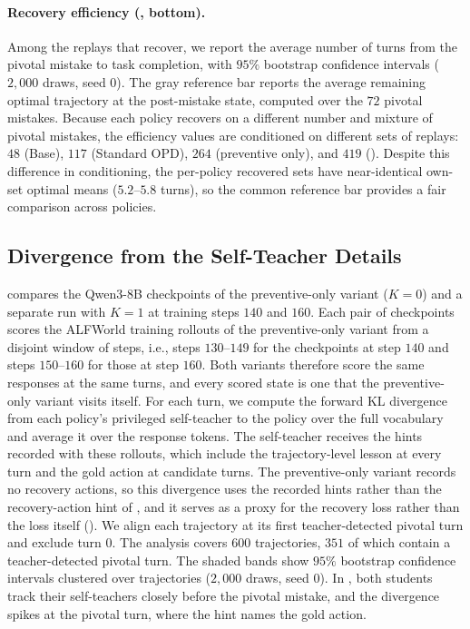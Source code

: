 \paragraph{Recovery efficiency (, bottom).} Among the replays that recover, we report the average number of turns from the pivotal mistake to task completion, with $95\%$ bootstrap confidence intervals ($2{,}000$ draws, seed $0$). The gray reference bar reports the average remaining optimal trajectory at the post-mistake state, computed over the $72$ pivotal mistakes. Because each policy recovers on a different number and mixture of pivotal mistakes, the efficiency values are conditioned on different sets of replays: $48$ (Base), $117$ (Standard OPD), $264$ (preventive only), and $419$ (\method{}). Despite this difference in conditioning, the per-policy recovered sets have near-identical own-set optimal means ($5.2$--$5.8$ turns), so the common reference bar provides a fair comparison across policies.

\subsection{Divergence from the Self-Teacher Details}
\label{app:recovery_kl}

 compares the Qwen3-8B checkpoints of the preventive-only variant ($K = 0$) and a separate \method{} run with $K = 1$ at training steps $140$ and $160$. Each pair of checkpoints scores the ALFWorld training rollouts of the preventive-only variant from a disjoint window of steps, i.e., steps $130$--$149$ for the checkpoints at step $140$ and steps $150$--$160$ for those at step $160$. Both variants therefore score the same responses at the same turns, and every scored state is one that the preventive-only variant visits itself. For each turn, we compute the forward KL divergence from each policy's privileged self-teacher to the policy over the full vocabulary and average it over the response tokens. The self-teacher receives the hints recorded with these rollouts, which include the trajectory-level lesson at every turn and the gold action at candidate turns. The preventive-only variant records no recovery actions, so this divergence uses the recorded hints rather than the recovery-action hint of , and it serves as a proxy for the recovery loss rather than the loss itself (). We align each trajectory at its first teacher-detected pivotal turn and exclude turn $0$. The analysis covers $600$ trajectories, $351$ of which contain a teacher-detected pivotal turn. The shaded bands show $95\%$ bootstrap confidence intervals clustered over trajectories ($2{,}000$ draws, seed $0$). In , both students track their self-teachers closely before the pivotal mistake, and the divergence spikes at the pivotal turn, where the hint names the gold action.

